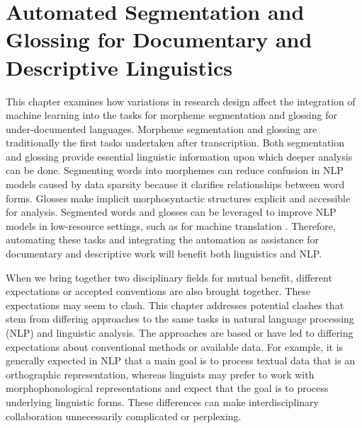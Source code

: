 \chapter{Automated Segmentation and Glossing for Documentary and Descriptive Linguistics}
\label{chap:seggloss}

This chapter examines how variations in research design affect the integration of machine learning into the tasks for morpheme segmentation and glossing for under-documented languages. Morpheme segmentation and glossing are traditionally the first tasks undertaken after transcription. Both segmentation and glossing provide essential linguistic information upon which deeper analysis can be done. Segmenting words into morphemes can reduce confusion in NLP models caused by data sparsity because it clarifies relationships between word forms. Glosses make implicit morphosyntactic structures explicit and accessible for analysis. Segmented words and glosses can be leveraged to improve NLP models in low-resource settings, such as for machine translation \citep{shearing_improving_2018,zhou_using_2020}. Therefore, automating these tasks and integrating the automation as assistance for documentary and descriptive work will benefit both linguistics and NLP.

When we bring together two disciplinary fields for mutual benefit, different expectations or accepted conventions are also brought together. These expectations may seem to clash. This chapter addresses potential clashes that stem from differing approaches to the same tasks in natural language processing (NLP) and linguistic analysis. The approaches are based or have led to differing expectations about conventional methods or available data. For example, it is generally expected in NLP that a main goal is to process textual data that is an orthographic representation, whereas linguists may prefer to work with morphophonological representations and expect that the goal is to process underlying linguistic forms. These differences can make interdisciplinary collaboration unnecessarily complicated or perplexing. 


